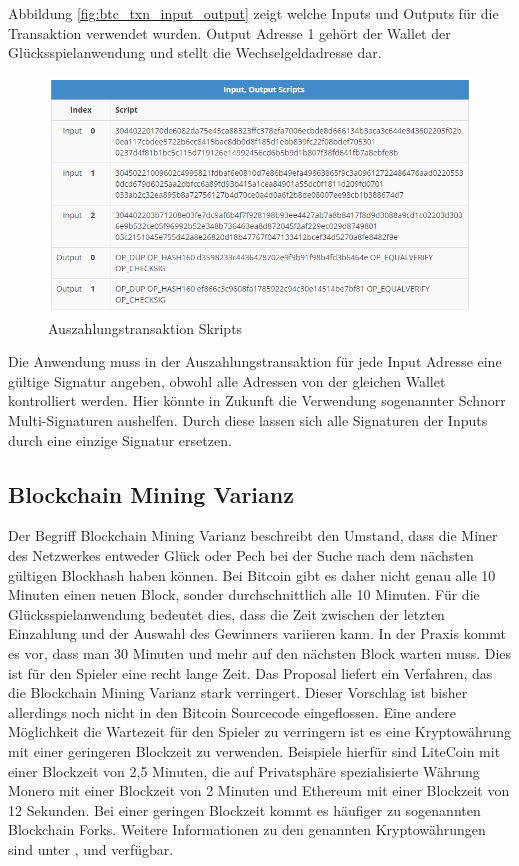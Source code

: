 Abbildung \ref{fig:btc_txn_input_output} zeigt welche Inputs und Outputs für die Transaktion verwendet wurden. Output Adresse 1 gehört der Wallet der Glücksspielanwendung und stellt die Wechselgeldadresse dar.


\begin{figure}[H]
\centering
\includegraphics[width=1\linewidth]{Figures/btc_gui/btc_txn_input_output_scripts}
\decoRule
\caption{Auszahlungstransaktion Skripts}
\label{fig:btc_txn_input_output_scripts}
\end{figure}

Die Anwendung muss in der Auszahlungstransaktion für jede Input Adresse eine gültige Signatur angeben, obwohl alle Adressen von der gleichen Wallet kontrolliert werden. Hier könnte in Zukunft die Verwendung sogenannter Schnorr Multi-Signaturen \cite{schnorr_sig} aushelfen. Durch diese lassen sich alle Signaturen der Inputs durch eine einzige Signatur ersetzen.

\subsection{Blockchain Mining Varianz}
Der Begriff Blockchain Mining Varianz beschreibt den Umstand, dass die Miner des Netzwerkes entweder Glück oder Pech bei der Suche nach dem nächsten gültigen Blockhash haben können. Bei Bitcoin gibt es daher nicht genau alle 10 Minuten einen neuen Block, sonder durchschnittlich alle 10 Minuten. Für die Glücksspielanwendung bedeutet dies, dass die Zeit zwischen der letzten Einzahlung und der Auswahl des Gewinners variieren kann. In der Praxis kommt es vor, dass man 30 Minuten und mehr auf den nächsten Block warten muss. Dies ist für den Spieler eine recht lange Zeit. Das Proposal \cite{bobtail} liefert ein Verfahren, das die Blockchain Mining Varianz stark verringert. Dieser Vorschlag ist bisher allerdings noch nicht in den Bitcoin Sourcecode eingeflossen.
Eine andere Möglichkeit die Wartezeit für den Spieler zu verringern ist es eine  Kryptowährung mit einer geringeren Blockzeit zu verwenden. Beispiele hierfür sind LiteCoin mit einer Blockzeit von 2,5 Minuten, die auf Privatsphäre spezialisierte Währung Monero mit einer Blockzeit von 2 Minuten und Ethereum mit einer Blockzeit von 12 Sekunden. Bei einer geringen Blockzeit kommt es häufiger zu sogenannten Blockchain Forks. Weitere Informationen zu den genannten Kryptowährungen sind unter \cite{coin_ltc}, \cite{coin_xmr} und \cite{coin_eth} verfügbar.

